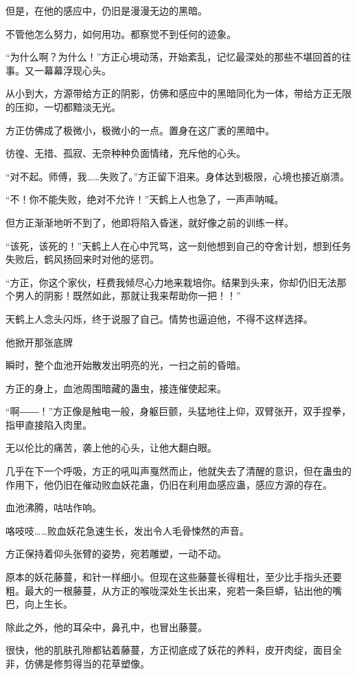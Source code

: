 \begin{this_body}
但是，在他的感应中，仍旧是漫漫无边的黑暗。

不管他怎么努力，如何用功。都察觉不到任何的迹象。

“为什么啊？为什么！”方正心境动荡，开始紊乱，记忆最深处的那些不堪回首的往事。又一幕幕浮现心头。

从小到大，方源带给方正的阴影，仿佛和感应中的黑暗同化为一体，带给方正无限的压抑，一切都黯淡无光。

方正仿佛成了极微小，极微小的一点。置身在这广袤的黑暗中。

彷徨、无措、孤寂、无奈种种负面情绪，充斥他的心头。

“对不起。师傅，我……失败了。”方正留下泪来。身体达到极限，心境也接近崩溃。

“不！你不能失败，绝对不允许！”天鹤上人也急了，一声声呐喊。

但方正渐渐地听不到了，他即将陷入昏迷，就好像之前的训练一样。

“该死，该死的！”天鹤上人在心中咒骂，这一刻他想到自己的夺舍计划，想到任务失败后，鹤风扬回来时对他的惩罚。

“方正，你这个家伙，枉费我倾尽心力地来栽培你。结果到头来，你却仍旧无法那个男人的阴影！既然如此，那就让我来帮助你一把！！”

天鹤上人念头闪烁，终于说服了自己。情势也逼迫他，不得不这样选择。

他掀开那张底牌

瞬时，整个血池开始散发出明亮的光，一扫之前的昏暗。

方正的身上，血池周围暗藏的蛊虫，接连催使起来。

“啊――！”方正像是触电一般，身躯巨颤，头猛地往上仰，双臂张开，双手捏拳，指甲直接陷入肉里。

无以伦比的痛苦，袭上他的心头，让他大翻白眼。

几乎在下一个呼吸，方正的吼叫声戛然而止，他就失去了清醒的意识，但在蛊虫的作用下，他仍旧在催动败血妖花蛊，仍旧在利用血感应蛊，感应方源的存在。

血池沸腾，咕咕作响。

咯吱吱……败血妖花急速生长，发出令人毛骨悚然的声音。

方正保持着仰头张臂的姿势，宛若雕塑，一动不动。

原本的妖花藤蔓，和针一样细小。但现在这些藤蔓长得粗壮，至少比手指头还要粗。最大的一根藤蔓，从方正的喉咙深处生长出来，宛若一条巨蟒，钻出他的嘴巴，向上生长。

除此之外，他的耳朵中，鼻孔中，也冒出藤蔓。

很快，他的肌肤孔隙都钻着藤蔓，方正彻底成了妖花的养料，皮开肉绽，面目全非，仿佛是修剪得当的花草塑像。


\end{this_body}
